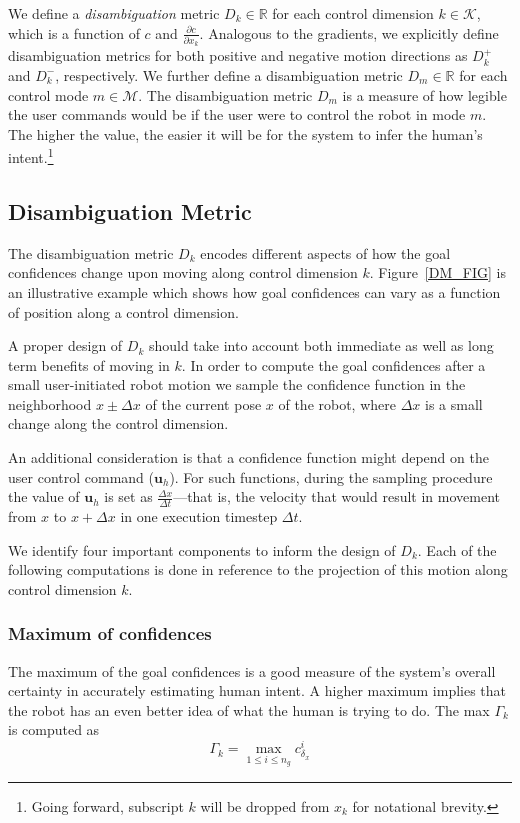 \documentclass[conference]{IEEEtran}
\begin{document}
We define a \textit{disambiguation} metric $D_{k}\in \mathbb{R}$ for each control dimension $k \in \mathcal{K}$, which is a function of $c$ and $\frac{\partial c}{\partial x_k}$. Analogous to the gradients, we explicitly define disambiguation metrics for both positive and negative motion directions as $D_{k}^{+}$ and $D_{k}^{-}$, respectively.
We further define a disambiguation metric $D_m \in \mathbb{R}$ for each control mode $m \in \mathcal{M}$.
The disambiguation metric $D_m$ is a measure of how legible the user commands would be if the user were to control the robot in mode $m$. The higher the value, the easier it will be for the system to infer the human's intent.\footnote{Going forward, subscript $k$ will be dropped from $x_k$ for notational brevity.} 

\subsection{Disambiguation Metric}\label{DM}

The disambiguation metric $D_{k}$ encodes different aspects of how the goal confidences change upon moving along control dimension $k$. Figure~\ref{DM_FIG} is an illustrative example which shows how goal confidences can vary as a function of position along a control dimension. 

A proper design of $D_{k}$ should take into account both immediate as well as long term benefits of moving in $k$. In order to compute the goal confidences after a small user-initiated robot motion we sample the confidence function in the neighborhood $x\pm\Delta x$ of the current pose $x$ of the robot, where $\Delta x$ is a small change along the control dimension. 
	
An additional consideration is that a confidence function might depend on the user control command ($\boldsymbol{u}_h$). For such functions, during the sampling procedure the value of $\boldsymbol{u}_h$ is set as $\frac{\Delta x}{\Delta t}$---that is, the velocity that would result in movement from $x$ to $x + \Delta x$ in one execution timestep $\Delta t$. 

We identify four important components to inform the design of $D_{k}$.
Each of the following computations is done in reference to the projection of this motion along control dimension $k$.


 
\subsubsection{Maximum of confidences}
The maximum of the goal confidences is a good measure of the system's overall certainty in accurately estimating human intent. A higher maximum implies that the robot has an even better idea of what the human is trying to do. The max $\Gamma_k$ is computed as
\begin{equation*}
\Gamma_k =\max\limits_{1 \leq i \leq n_g}c^{i}_{\delta_x}
\end{equation*}
\end{document}
